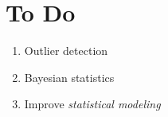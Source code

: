 \section{To Do}

\begin{enumerate}
  \item Outlier detection
  \item Bayesian statistics
  \item Improve \emph{statistical modeling}
\end{enumerate}
